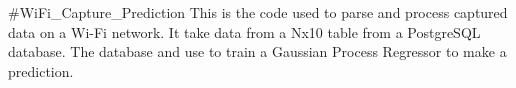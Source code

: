 \#\+Wi\+Fi\+\_\+\+Capture\+\_\+\+Prediction This is the code used to parse and process captured data on a Wi-\/Fi network. It take data from a Nx10 table from a Postgre\+S\+QL database. The database and use to train a Gaussian Process Regressor to make a prediction. 
